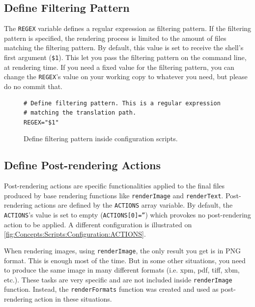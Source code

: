 \subsection{Define Filtering Pattern}

The \texttt{REGEX} variable defines a regular expression as filtering
pattern.  If the filtering pattern is specified, the rendering process
is limited to the amount of files matching the filtering pattern.  By
default, this value is set to receive the shell's first argument
(\texttt{\$1}).  This let you pass the filtering pattern on the
command line, at rendering time.  If you need a fixed value for the
filtering pattern, you can change the \texttt{REGEX}'s value on your
working copy to whatever you need, but please do no commit that.

\begin{figure}[!hbp]
\hrulefill
\begin{verbatim}
# Define filtering pattern. This is a regular expression 
# matching the translation path.
REGEX="$1"
\end{verbatim}
\hrulefill
\caption{Define filtering pattern inside configuration scripts.%
   \label{fig:Concepts:Scripts:Configuration:REGEX}}
\end{figure}

\subsection{Define Post-rendering Actions}
\hypertarget{sec:Concepts:Scripts:Configuration:ACTIONS}{}
\label{sec:Concepts:Scripts:Configuration:ACTIONS}

Post-rendering actions are specific functionalities applied to the
final files produced by base rendering functions like
\texttt{renderImage} and \texttt{renderText}.  Post-rendering actions
are defined by the \texttt{ACTIONS} array variable.  By default, the
\texttt{ACTIONS}'s value is set to empty (\texttt{ACTIONS[0]=''})
which provokes no post-rendering action to be applied. A different
configuration is illustrated on
\autoref{fig:Concepts:Scripts:Configuration:ACTIONS}. 

When rendering images, using \texttt{renderImage}, the only result you
get is in PNG format. This is enough most of the time. But in some
other situations, you need to produce the same image in many different
formats (i.e. xpm, pdf, tiff, xbm, etc.). These tasks are very
specific and are not included inside \texttt{renderImage} function.
Instead, the \texttt{renderFormats} function was created and used as
post-rendering action in these situations.

